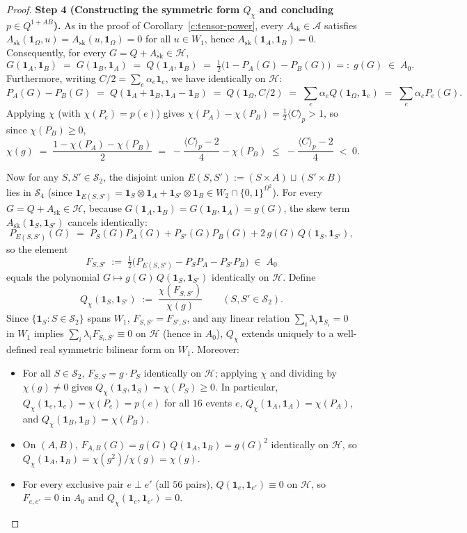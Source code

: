 \documentclass[11pt,a4paper]{article}
\theoremstyle{definition}
\theoremstyle{remark}
\newcommand{\ind}[1]{\mathbf{1}_{#1}}
\newcommand{\ev}[1]{\langle #1\rangle_p}
\newcommand{\QAB}{Q^{1+AB}}
\begin{document}
\begin{proof}
\medskip\noindent\textbf{Step 4 (Constructing the symmetric form $Q_\chi$ and concluding $p \in \QAB$).}
As in the proof of Corollary~\ref{c:tensor-power}, every $A_{\mathrm{sk}} \in \mathcal{A}$ satisfies $A_{\mathrm{sk}}(\ind\Omega, u) = A_{\mathrm{sk}}(u, \ind\Omega) = 0$ for all $u \in W_1$, hence $A_{\mathrm{sk}}(\ind A, \ind B) = 0$. Consequently, for every $G = Q + A_{\mathrm{sk}} \in \mathcal{H}$,
\[
  G(\ind A, \ind B) \;=\; G(\ind B, \ind A) \;=\; Q(\ind A, \ind B) \;=\; \tfrac{1}{2}\bigl(1 - P_A(G) - P_B(G)\bigr) \;=:\; g(G) \;\in\; A_0.
\]
Furthermore, writing $C/2 = \sum_e \alpha_e \ind e$, we have identically on $\mathcal{H}$:
\[
  P_A(G) - P_B(G) \;=\; Q(\ind A + \ind B, \ind A - \ind B) \;=\; Q(\ind\Omega, C/2) \;=\; \sum_e \alpha_e Q(\ind\Omega, \ind e) \;=\; \sum_e \alpha_e P_e(G).
\]
Applying $\chi$ (with $\chi(P_e) = p(e)$) gives $\chi(P_A) - \chi(P_B) = \frac{1}{2}\ev{C} > 1$, so since $\chi(P_B) \ge 0$,
\[
  \chi(g) \;=\; \frac{1 - \chi(P_A) - \chi(P_B)}{2} \;=\; -\frac{\ev{C} - 2}{4} - \chi(P_B) \;\le\; -\frac{\ev{C} - 2}{4} \;<\; 0.
\]

Now for any $S, S' \in \mathcal{S}_2$, the disjoint union $E(S, S') := (S \times A) \sqcup (S' \times B)$ lies in $\mathcal{S}_4$ (since $\ind{E(S,S')} = \ind S \otimes \ind A + \ind{S'} \otimes \ind B \in W_2 \cap \{0,1\}^{\Omega^2}$). For every $G = Q + A_{\mathrm{sk}} \in \mathcal{H}$, because $G(\ind A, \ind B) = G(\ind B, \ind A) = g(G)$, the skew term $A_{\mathrm{sk}}(\ind S, \ind{S'})$ cancels identically:
\[
  P_{E(S, S')}(G) \;=\; P_S(G) P_A(G) + P_{S'}(G) P_B(G) + 2\, g(G)\, Q(\ind S, \ind{S'}),
\]
so the element
\[
  F_{S, S'} \;:=\; \tfrac{1}{2}\bigl(P_{E(S, S')} - P_S P_A - P_{S'} P_B\bigr) \;\in\; A_0
\]
equals the polynomial $G \mapsto g(G)\, Q(\ind S, \ind{S'})$ identically on $\mathcal{H}$. Define
\[
  Q_\chi(\ind S, \ind{S'}) \;:=\; \frac{\chi(F_{S, S'})}{\chi(g)} \qquad (S, S' \in \mathcal{S}_2).
\]
Since $\{\ind S : S \in \mathcal{S}_2\}$ spans $W_1$, $F_{S, S'} = F_{S', S}$, and any linear relation $\sum_i \lambda_i \ind{S_i} = 0$ in $W_1$ implies $\sum_i \lambda_i F_{S_i, S'} \equiv 0$ on $\mathcal{H}$ (hence in $A_0$), $Q_\chi$ extends uniquely to a well-defined real symmetric bilinear form on $W_1$. Moreover:
\begin{itemize}
  \item For all $S \in \mathcal{S}_2$, $F_{S, S} = g \cdot P_S$ identically on $\mathcal{H}$; applying $\chi$ and dividing by $\chi(g) \neq 0$ gives $Q_\chi(\ind S, \ind S) = \chi(P_S) \ge 0$. In particular, $Q_\chi(\ind e, \ind e) = \chi(P_e) = p(e)$ for all $16$ events $e$, $Q_\chi(\ind A, \ind A) = \chi(P_A)$, and $Q_\chi(\ind B, \ind B) = \chi(P_B)$.
  \item On $(A, B)$, $F_{A, B}(G) = g(G)\, Q(\ind A, \ind B) = g(G)^2$ identically on $\mathcal{H}$, so $Q_\chi(\ind A, \ind B) = \chi(g^2)/\chi(g) = \chi(g)$.
  \item For every exclusive pair $e \perp e'$ (all $56$ pairs), $Q(\ind e, \ind{e'}) \equiv 0$ on $\mathcal{H}$, so $F_{e, e'} = 0$ in $A_0$ and $Q_\chi(\ind e, \ind{e'}) = 0$.
\end{itemize}


\end{proof}
\end{document}
